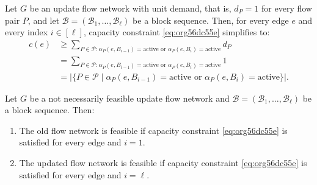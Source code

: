 \documentclass[fontsize=11pt,paper=a4]{book}
\begin{document}
\begin{remark}
Let \(G\) be an update flow network with unit demand, that is, \(d_P=1\) for every flow pair \(P\), and let \(\mathcal{B}=(\mathscr{B}_1,\dots,\mathscr{B}_{\ell})\) be a block sequence.
Then, for every edge \(e\) and every index \(i\in[\ell]\), capacity constraint \ref{eq:org56dc55e} simplifies to:
\begin{align*}
c(e)
&\geq\sum_{P\in\mathcal{P}:\alpha_P(e,B_{i-1})=\mathrm{active}\text{ or }\alpha_P(e,B_i)=\mathrm{active}}d_P\\
&=\sum_{P\in\mathcal{P}:\alpha_P(e,B_{i-1})=\mathrm{active}\text{ or }\alpha_P(e,B_i)=\mathrm{active}}1\\
&=\lvert\{P\in\mathcal{P}\mid\alpha_P(e,B_{i-1})=\mathrm{active}\text{ or }\alpha_P(e,B_i)=\mathrm{active}\}\rvert.
\end{align*}
\label{orgdd2250d}
\end{remark}

\begin{lem}
Let \(G\) be a not necessarily feasible update flow network and \(\mathcal{B}=(\mathscr{B}_1,\dots,\mathscr{B}_{\ell})\) be a block sequence. Then:

\begin{enumerate}
\item \label{itm:lem-update-flow-network-feasible-if-1}
The old flow network is feasible if capacity constraint \ref{eq:org56dc55e} is satisfied for every edge and \(i=1\).

\item \label{itm:lem-update-flow-network-feasible-if-2}
The updated flow network is feasible if capacity constraint \ref{eq:org56dc55e} is satisfied for every edge and \(i=\ell\).
\end{enumerate}
\label{orgbdf4e02}
\end{lem}
\end{document}
